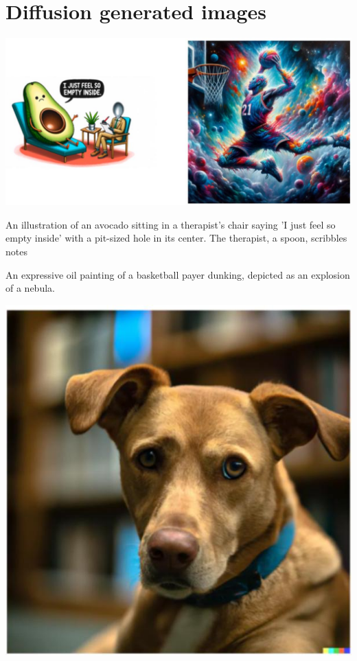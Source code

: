 \documentclass[10pt]{article}
\begin{document}
\section*{Diffusion generated images}
\begin{center}
\includegraphics[max width=\textwidth]{2024_01_08_a381fc3992661ee7020eg-19(2)}
\end{center}

An illustration of an avocado sitting in a therapist's chair saying 'I just feel so empty inside' with a pit-sized hole in its center. The therapist, a spoon, scribbles notes

An expressive oil painting of a basketball payer dunking, depicted as an explosion of a nebula.

\begin{center}
\includegraphics[max width=\textwidth]{2024_01_08_a381fc3992661ee7020eg-19(1)}
\end{center}
\end{document}
